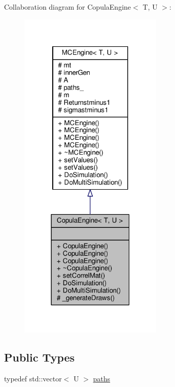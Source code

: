 Collaboration diagram for Copula\+Engine$<$ T, U $>$\+:
\nopagebreak
\begin{figure}[H]
\begin{center}
\leavevmode
\includegraphics[width=195pt]{classCopulaEngine__coll__graph}
\end{center}
\end{figure}
\subsection*{Public Types}
\begin{DoxyCompactItemize}
\item 
typedef std\+::vector$<$ U $>$ \hyperlink{classCopulaEngine_a75e30032c9b2290243a83ea7d343a62c}{paths}
\end{DoxyCompactItemize}
